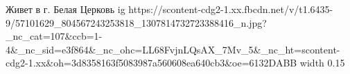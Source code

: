  
 
 
 
 

\par
Живет в г. Белая Церковь
\ifcmt
  ig https://scontent-cdg2-1.xx.fbcdn.net/v/t1.6435-9/57101629_804567243253818_1307814732723388416_n.jpg?_nc_cat=107&ccb=1-4&_nc_sid=e3f864&_nc_ohc=LL68FvjnLQsAX_7Mv_5&_nc_ht=scontent-cdg2-1.xx&oh=3d8358163f5083987a560608ea640cb3&oe=6132DABB
  width 0.15
\fi


